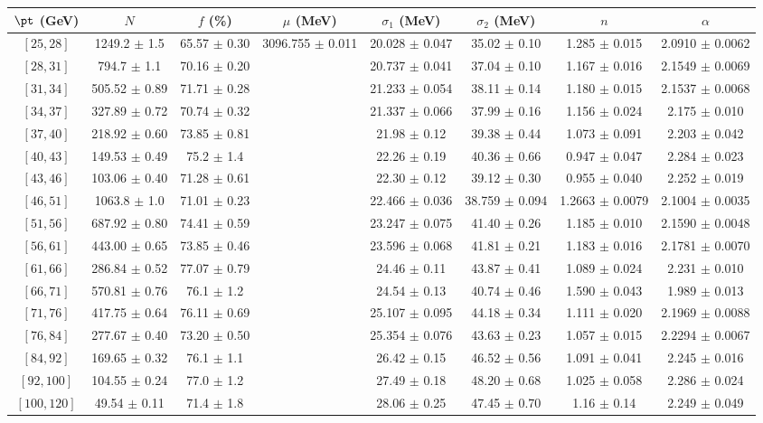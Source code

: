 \begin{tabular}{c||c|c|c|c|c|c|c}
$\pt$ (GeV) & $N$ & $f$ (\%) & $\mu$ (MeV) & $\sigma_1$ (MeV) & $\sigma_2$ (MeV) & $n$ & $\alpha$ \\
\hline
$[25, 28]$ & 1249.2 $\pm$ 1.5 & 65.57 $\pm$ 0.30 & \multirow{17}{*}{3096.755 $\pm$ 0.011} & 20.028 $\pm$ 0.047 & 35.02 $\pm$ 0.10 & 1.285 $\pm$ 0.015 & 2.0910 $\pm$ 0.0062\\
$[28, 31]$ & 794.7 $\pm$ 1.1 & 70.16 $\pm$ 0.20 &  & 20.737 $\pm$ 0.041 & 37.04 $\pm$ 0.10 & 1.167 $\pm$ 0.016 & 2.1549 $\pm$ 0.0069\\
$[31, 34]$ & 505.52 $\pm$ 0.89 & 71.71 $\pm$ 0.28 &  & 21.233 $\pm$ 0.054 & 38.11 $\pm$ 0.14 & 1.180 $\pm$ 0.015 & 2.1537 $\pm$ 0.0068\\
$[34, 37]$ & 327.89 $\pm$ 0.72 & 70.74 $\pm$ 0.32 &  & 21.337 $\pm$ 0.066 & 37.99 $\pm$ 0.16 & 1.156 $\pm$ 0.024 & 2.175 $\pm$ 0.010\\
$[37, 40]$ & 218.92 $\pm$ 0.60 & 73.85 $\pm$ 0.81 &  & 21.98 $\pm$ 0.12 & 39.38 $\pm$ 0.44 & 1.073 $\pm$ 0.091 & 2.203 $\pm$ 0.042\\
$[40, 43]$ & 149.53 $\pm$ 0.49 & 75.2 $\pm$ 1.4 &  & 22.26 $\pm$ 0.19 & 40.36 $\pm$ 0.66 & 0.947 $\pm$ 0.047 & 2.284 $\pm$ 0.023\\
$[43, 46]$ & 103.06 $\pm$ 0.40 & 71.28 $\pm$ 0.61 &  & 22.30 $\pm$ 0.12 & 39.12 $\pm$ 0.30 & 0.955 $\pm$ 0.040 & 2.252 $\pm$ 0.019\\
$[46, 51]$ & 1063.8 $\pm$ 1.0 & 71.01 $\pm$ 0.23 &  & 22.466 $\pm$ 0.036 & 38.759 $\pm$ 0.094 & 1.2663 $\pm$ 0.0079 & 2.1004 $\pm$ 0.0035\\
$[51, 56]$ & 687.92 $\pm$ 0.80 & 74.41 $\pm$ 0.59 &  & 23.247 $\pm$ 0.075 & 41.40 $\pm$ 0.26 & 1.185 $\pm$ 0.010 & 2.1590 $\pm$ 0.0048\\
$[56, 61]$ & 443.00 $\pm$ 0.65 & 73.85 $\pm$ 0.46 &  & 23.596 $\pm$ 0.068 & 41.81 $\pm$ 0.21 & 1.183 $\pm$ 0.016 & 2.1781 $\pm$ 0.0070\\
$[61, 66]$ & 286.84 $\pm$ 0.52 & 77.07 $\pm$ 0.79 &  & 24.46 $\pm$ 0.11 & 43.87 $\pm$ 0.41 & 1.089 $\pm$ 0.024 & 2.231 $\pm$ 0.010\\
$[66, 71]$ & 570.81 $\pm$ 0.76 & 76.1 $\pm$ 1.2 &  & 24.54 $\pm$ 0.13 & 40.74 $\pm$ 0.46 & 1.590 $\pm$ 0.043 & 1.989 $\pm$ 0.013\\
$[71, 76]$ & 417.75 $\pm$ 0.64 & 76.11 $\pm$ 0.69 &  & 25.107 $\pm$ 0.095 & 44.18 $\pm$ 0.34 & 1.111 $\pm$ 0.020 & 2.1969 $\pm$ 0.0088\\
$[76, 84]$ & 277.67 $\pm$ 0.40 & 73.20 $\pm$ 0.50 &  & 25.354 $\pm$ 0.076 & 43.63 $\pm$ 0.23 & 1.057 $\pm$ 0.015 & 2.2294 $\pm$ 0.0067\\
$[84, 92]$ & 169.65 $\pm$ 0.32 & 76.1 $\pm$ 1.1 &  & 26.42 $\pm$ 0.15 & 46.52 $\pm$ 0.56 & 1.091 $\pm$ 0.041 & 2.245 $\pm$ 0.016\\
$[92, 100]$ & 104.55 $\pm$ 0.24 & 77.0 $\pm$ 1.2 &  & 27.49 $\pm$ 0.18 & 48.20 $\pm$ 0.68 & 1.025 $\pm$ 0.058 & 2.286 $\pm$ 0.024\\
$[100, 120]$ & 49.54 $\pm$ 0.11 & 71.4 $\pm$ 1.8 &  & 28.06 $\pm$ 0.25 & 47.45 $\pm$ 0.70 & 1.16 $\pm$ 0.14 & 2.249 $\pm$ 0.049\\
\end{tabular}
